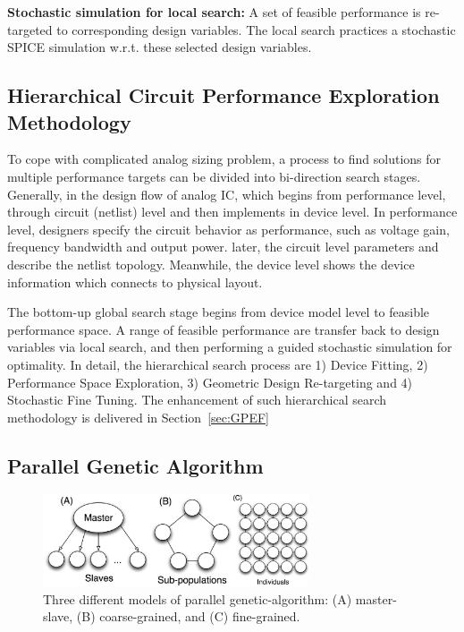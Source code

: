       \begin{defi}
        {\bf Stochastic simulation for local search:} A set of feasible performance is re-targeted to corresponding design variables. The local search practices a stochastic SPICE simulation w.r.t. these selected design variables. 
      \end{defi}
    \subsection{Hierarchical Circuit Performance Exploration Methodology\cite{PerfMap_ISQED2011}}
      To cope with complicated analog sizing problem, a process to find solutions for multiple performance targets can be divided into bi-direction search stages. Generally, in the design flow of analog IC, which begins from performance level, through circuit (netlist) level and then implements in device level. In performance level, designers specify the circuit behavior as performance, such as voltage gain, frequency bandwidth and output power. later, the circuit level parameters and describe the netlist topology. Meanwhile, the device level shows the device information which connects to physical layout. 

      The bottom-up global search stage begins from device model level to feasible performance space. A range of feasible performance are transfer back to design variables via local search, and then performing a guided stochastic simulation for optimality. In detail, the hierarchical search process are 1) Device Fitting, 2) Performance Space Exploration, 3) Geometric Design Re-targeting and 4) Stochastic Fine Tuning. The enhancement of such hierarchical search methodology is delivered in Section~\ref{sec:GPEF}
    \subsection{Parallel Genetic Algorithm}\label{subsec:PGAIntro}
      \begin{figure}[t]
        \centering
        \centerline{
          \includegraphics[width=0.7\textwidth]{Fig/Chapter2/PGA_reduced.eps}
        }
        \caption{Three different models of parallel genetic-algorithm: (A) master-slave, (B) coarse-grained, and (C) fine-grained.}
        \label{fig:PGA}
        \end{figure}

